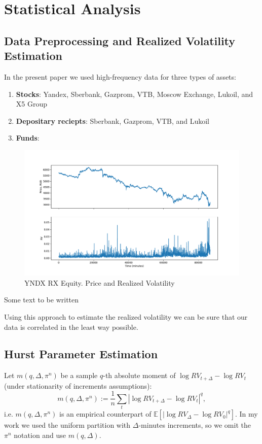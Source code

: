 \section{Statistical Analysis}
    \subsection{Data Preprocessing and Realized Volatility Estimation}
        In the present paper we used high-frequency data for three types of assets:
        \begin{enumerate}
            \item\textbf{Stocks}: Yandex, Sberbank, Gazprom, VTB, Moscow Exchange, Lukoil, and X5 Group
            \item\textbf{Depositary reciepts}: Sberbank, Gazprom, VTB, and Lukoil
            \item\textbf{Funds}:
        \end{enumerate}

        \begin{figure}[htbp]
            \includegraphics[width=\textwidth]{fig/YNDX RX Equity RVol.pdf}
            \caption{YNDX RX Equity. Price and Realized Volatility}
        \end{figure}

        Some text to be written

        Using this approach to estimate the realized volatility we can be sure that our data is correlated in the least way possible.

    \subsection{Hurst Parameter Estimation}
        Let $m(q, \Delta, \pi^n)$ be a sample $q$-th absolute moment of $\log RV_{t+\Delta} - \log RV_t$ 
        (under stationarity of increments assumptions):
        \begin{equation}
            m(q, \Delta, \pi^n) := \frac{1}{n} \sum_{t} \left|\log RV_{t + \Delta} - \log RV_t\right|^q,
        \end{equation}
        i.e. $m(q, \Delta, \pi^n)$ is an empirical counterpart of $\mathbb{E}\left[\left|\log RV_{\Delta} - \log RV_0\right|^q\right]$. 
        In my work we used the uniform partition with $\Delta$-minutes increments, so we omit the $\pi^n$ notation and use $m(q, \Delta)$.

